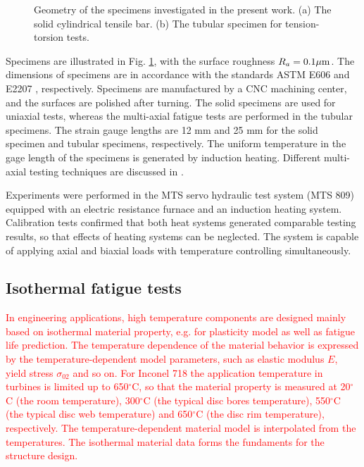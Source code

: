 \documentclass[preprint,5p,twocolumn,11pt,sort&compress]{elsarticle}
\newcommand{\marked}[1]{\textcolor{red}{#1}}
\begin{document}
\begin{figure}[tb]
\caption{Geometry of the specimens investigated in the present work. (a) The solid cylindrical tensile bar. (b) The tubular specimen for tension-torsion tests.}
\label{Fig:Specimen}
\end{figure}

Specimens are illustrated in Fig. \ref{Fig:Specimen}, with the surface roughness  $R_a=0.1\rm{\mu m}$. The dimensions of specimens are in accordance with the standards ASTM E606 \cite{astm2012606} and E2207 \cite{standard2007e2207}, respectively. Specimens are manufactured by a CNC machining center, and the surfaces are polished after turning. The solid specimens are used for uniaxial tests, whereas the multi-axial fatigue tests are performed in the tubular specimens. The strain gauge lengths are 12 mm and 25 mm for the solid specimen and tubular specimens, respectively. The uniform temperature in the gage length of the specimens is generated by induction heating. Different multi-axial testing techniques are discussed in \cite{socie2000multiaxial}.

Experiments were performed in the MTS servo hydraulic test system (MTS 809) equipped with an electric resistance furnace and an induction heating system. Calibration tests confirmed that both heat systems generated comparable testing results, so that effects of heating systems can be neglected. The system is capable of applying axial and biaxial loads with temperature controlling simultaneously.

\subsection{Isothermal fatigue tests}
\noindent
\marked{In engineering applications, high temperature components are designed mainly based on isothermal material property, e.g. for plasticity model as well as fatigue life prediction. The temperature dependence of the material behavior is expressed by the temperature-dependent model parameters, such as elastic modulus $E$, yield stress $\sigma_{02}$ and so on. For Inconel 718 the application temperature in turbines is limited up to 650$^\circ$C, so that the material property is measured at 20$^{\circ}$C (the room temperature), 300$^{\circ}$C (the typical disc bores temperature), 550$^{\circ}$C (the typical disc web temperature) and 650$^{\circ}$C (the disc rim temperature), respectively. The temperature-dependent material model is interpolated from the temperatures. The isothermal material data forms the fundaments for the structure design.}
\end{document}
